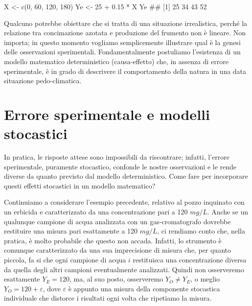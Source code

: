 \documentclass[a4paper,12pt,oneside]{book}
\newenvironment{Shaded}{\begin{snugshade}}{\end{snugshade}}
\newcommand{\DecValTok}[1]{#1}
\newcommand{\FloatTok}[1]{#1}
\newcommand{\SpecialCharTok}[1]{#1}
\newcommand{\DocumentationTok}[1]{#1}
\newcommand{\OtherTok}[1]{#1}
\newcommand{\FunctionTok}[1]{#1}
\newcommand{\NormalTok}[1]{#1}
\begin{document}
\begin{Shaded}
\begin{Highlighting}[]
\NormalTok{X }\OtherTok{\textless{}{-}} \FunctionTok{c}\NormalTok{(}\DecValTok{0}\NormalTok{, }\DecValTok{60}\NormalTok{, }\DecValTok{120}\NormalTok{, }\DecValTok{180}\NormalTok{)}
\NormalTok{Ye }\OtherTok{\textless{}{-}} \DecValTok{25} \SpecialCharTok{+} \FloatTok{0.15} \SpecialCharTok{*}\NormalTok{ X}
\NormalTok{Ye}
\DocumentationTok{\#\# [1] 25 34 43 52}
\end{Highlighting}
\end{Shaded}

Qualcuno potrebbe obiettare che si tratta di una situazione irrealistica, perché la relazione tra concimazione azotata e produzione del frumento non è lineare. Non importa; in questo momento vogliamo semplicemente illustrare qual è la genesi delle osservazioni sperimentali. Fondamentalmente postuliamo l'esistenza di un modello matematico deterministico (causa-effetto) che, in assenza di errore sperimentale, è in grado di descrivere il comportamento della natura in una data situazione pedo-climatica.

\hypertarget{errore-sperimentale-e-modelli-stocastici}{%
\section{Errore sperimentale e modelli stocastici}\label{errore-sperimentale-e-modelli-stocastici}}

In pratica, le risposte attese sono impossibili da riscontrare; infatti, l'errore sperimentale, puramente stocastico, confonde le nostre osservazioni e le rende diverse da quanto previsto dal modello deterministico. Come fare per incorporare questi effetti stocastici in un modello matematico?

Continuiamo a considerare l'esempio precedente, relativo al pozzo inquinato con un erbicida e caratterizzato da una concentrazione pari a 120 \(mg/L\). Anche se un qualunque campione di acqua analizzata con un gas-cromatografo dovrebbe restituire una misura pari esattamente a 120 \(mg/L\), ci rendiamo conto che, nella pratica, è molto probabile che questo non accada. Infatti, lo strumento è comunque caratterizzato da una sua imprecisione di misura che, per quanto piccola, fa si che ogni campione di acqua \(i\) restituisca una concentrazione diversa da quella degli altri campioni eventualmente analizzati. Quindi non osserveremo esattamente \(Y_E = 120\), ma, al suo posto, osserveremo \(Y_O \neq Y_E\), o meglio \(Y_O = 120 + \varepsilon\), dove \(\varepsilon\) è appunto una misura della componente stocastica individuale che distorce i risultati ogni volta che ripetiamo la misura.
\end{document}
